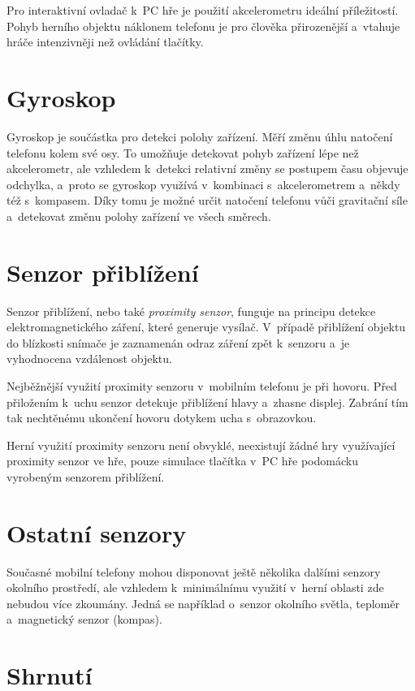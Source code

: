 \documentclass[thesis=B,czech,hidelinks]{FITthesis}[2012/06/26] %
\begin{document}
Pro interaktivní ovladač k~PC hře je použití akcelerometru ideální příležitostí. Pohyb herního objektu náklonem telefonu je pro člověka přirozenější a~vtahuje hráče intenzivněji než ovládání tlačítky. 

\section{Gyroskop}

Gyroskop je součástka pro detekci polohy zařízení. Měří změnu úhlu natočení telefonu kolem své osy. To umožňuje detekovat pohyb zařízení lépe než akcelerometr, ale vzhledem k~detekci relativní změny se postupem času objevuje odchylka, a~proto se gyroskop využívá v~kombinaci s~akcelerometrem a~někdy též s~kompasem. Díky tomu je možné určit natočení telefonu vůči gravitační síle a~detekovat změnu polohy zařízení ve všech směrech. \cite{gyroscope}

\section{Senzor přiblížení}

Senzor přiblížení, nebo také \textit{proximity senzor}, funguje na principu detekce elektromagnetického záření, které generuje vysílač. V~případě přiblížení objektu do blízkosti snímače je zaznamenán odraz záření zpět k~senzoru a~je vyhodnocena vzdálenost objektu. \cite{proximity}

Nejběžnější využití proximity senzoru v~mobilním telefonu je při hovoru. Před přiložením k~uchu senzor detekuje přiblížení hlavy a~zhasne displej. Zabrání tím tak nechtěnému ukončení hovoru dotykem ucha s~obrazovkou.

Herní využití proximity senzoru není obvyklé, neexistují žádné hry využívající proximity senzor ve hře, pouze simulace tlačítka v~PC hře podomácku vyrobeným senzorem přiblížení. \cite{proximitygame}

\section{Ostatní senzory}

Současné mobilní telefony mohou disponovat ještě několika dalšími senzory okolního prostředí, ale vzhledem k~minimálnímu využití v~herní oblasti zde nebudou více zkoumány. Jedná se například o~senzor okolního světla, teploměr a~magnetický senzor (kompas). 

\section{Shrnutí}
\end{document}
